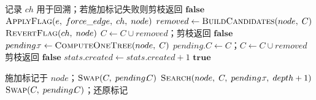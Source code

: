 \documentclass{article}
\newenvironment{overflow}
  {\tcolorbox[breakable, colback=white, colframe=black, boxrule=0.5pt, arc=0pt,
              left=2pt, right=2pt, top=2pt, bottom=2pt]}
  {\endtcolorbox}
\begin{document}
\begin{overflow}
\begin{algorithm}[H]
\begin{algorithmic}[1]
\Statex

    \State 记录 $ch$ 用于回溯；若施加标记失败则剪枝返回 $\textbf{false}$
    \State $\Call{ApplyFlag}{e,\;force\_edge,\;ch,\;node}$
    \State $removed \gets \Call{BuildCandidates}{node,\;C}$ 
    \State $\Call{RevertFlag}{ch,\;node}$ 
     $C \gets C \cup removed$；剪枝返回 $\textbf{false}$ \EndIf
    \State $pending.\!\tau \gets \Call{ComputeOneTree}{node,\;C}$ 
    \State $pending.\!C \gets C$；$C \gets C \cup removed$ 
     剪枝返回 $\textbf{false}$ \EndIf
    \State $\textit{stats}.\!\textit{created} \gets \textit{stats}.\!\textit{created} + 1$
    \State \Return $\textbf{true}$
\EndFunction

\Statex

    \State 施加标记于 $node$；$\Call{Swap}{C,\;pending.\!C}$ 
    \State $\Call{Search}{node,\;C,\;pending.\!\tau,\;depth+1}$
    \State $\Call{Swap}{C,\;pending.\!C}$；还原标记 
\EndFunction
\end{algorithmic}
\end{algorithm}
\end{overflow}

\newpage
\end{document}

